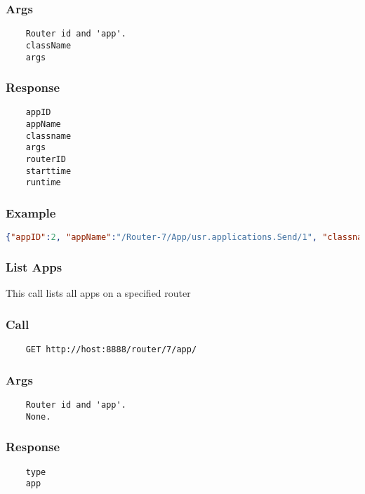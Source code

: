\subsubsection*{Args}
\begin{verbatim}
	Router id and 'app'. 
	className
	args
\end{verbatim}

\subsubsection*{Response}
\begin{verbatim}
	appID
	appName
	classname
	args
	routerID
	starttime
	runtime
\end{verbatim}

\subsubsection*{Example}
\begin{lstlisting}[language=json]
{"appID":2, "appName":"/Router-7/App/usr.applications.Send/1", "classname":"usr.applications.Send", "args":"[8, 4000, 2500000, -s, 1024]", "routerID":7, "starttime":1362090555686,"runtime":0}
\end{lstlisting}


\hr
\subsubsection{List Apps}
This call lists all apps on a specified router
\subsubsection*{Call}
\begin{verbatim}
	GET http://host:8888/router/7/app/
\end{verbatim}

\subsubsection*{Args}
\begin{verbatim}
	Router id and 'app'. 
	None.
\end{verbatim}

\subsubsection*{Response}
\begin{verbatim}
	type
	app
\end{verbatim}

